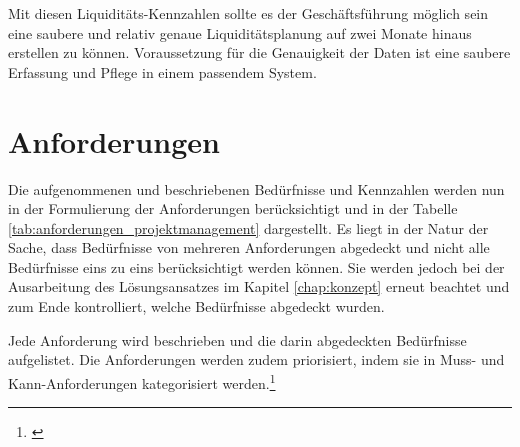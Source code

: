 Mit diesen Liquiditäts-Kennzahlen sollte es der Geschäftsführung möglich sein
eine saubere und relativ genaue Liquiditätsplanung auf zwei Monate hinaus
erstellen zu können. Voraussetzung für die Genauigkeit der Daten ist eine
saubere Erfassung und Pflege in einem passendem System.

\clearpage

\section{Anforderungen}\label{chap:sec_anforderungen}
Die aufgenommenen und beschriebenen Bedürfnisse und Kennzahlen werden nun in der Formulierung
der Anforderungen berücksichtigt und in der Tabelle \ref{tab:anforderungen_projektmanagement} 
dargestellt. Es liegt in der Natur der Sache, dass Bedürfnisse von mehreren 
Anforderungen abgedeckt und nicht alle Bedürfnisse eins zu eins berücksichtigt 
werden können. Sie werden jedoch bei der Ausarbeitung des Lösungsansatzes im Kapitel \ref{chap:konzept}
erneut beachtet und zum Ende kontrolliert, welche Bedürfnisse abgedeckt wurden.

Jede Anforderung wird beschrieben und die darin abgedeckten Bedürfnisse aufgelistet. 
Die Anforderungen werden zudem priorisiert, indem sie in Muss- und Kann-Anforderungen 
kategorisiert werden.\footnote{\citealp*[Vgl.][S. 32]{hobel2006gabler}}

